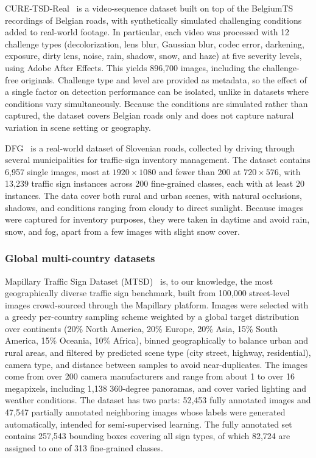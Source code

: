 \documentclass[runningheads]{llncs}
\begin{document}
CURE-TSD-Real~\cite{temel2019traffic} is a video-sequence dataset built on top of the BelgiumTS recordings of Belgian roads, with synthetically simulated challenging conditions added to real-world footage. In particular, each video was processed with 12 challenge types (decolorization, lens blur, Gaussian blur, codec error, darkening, exposure, dirty lens, noise, rain, shadow, snow, and haze) at five severity levels, using Adobe After Effects. This yields 896,700 images, including the challenge-free originals. Challenge type and level are provided as metadata, so the effect of a single factor on detection performance can be isolated, unlike in datasets where conditions vary simultaneously. Because the conditions are simulated rather than captured, the dataset covers Belgian roads only and does not capture natural variation in scene setting or geography.

DFG~\cite{tabernik2019deep} is a real-world dataset of Slovenian roads, collected by driving through several municipalities for traffic-sign inventory management. The dataset contains 6,957 single images, most at $1920\times1080$ and fewer than 200 at $720\times576$, with 13,239 traffic sign instances across 200 fine-grained classes, each with at least 20 instances. The data cover both rural and urban scenes, with natural occlusions, shadows, and conditions ranging from cloudy to direct sunlight. Because images were captured for inventory purposes, they were taken in daytime and avoid rain, snow, and fog, apart from a few images with slight snow cover.

\subsubsection{Global multi-country datasets}
Mapillary Traffic Sign Dataset (MTSD)~\cite{ertler2020mapillary} is, to our knowledge, the most geographically diverse traffic sign benchmark, built from 100,000 street-level images crowd-sourced through the Mapillary platform. Images were selected with a greedy per-country sampling scheme weighted by a global target distribution over continents (20\% North America, 20\% Europe, 20\% Asia, 15\% South America, 15\% Oceania, 10\% Africa), binned geographically to balance urban and rural areas, and filtered by predicted scene type (city street, highway, residential), camera type, and distance between samples to avoid near-duplicates. The images come from over 200 camera manufacturers and range from about 1 to over 16 megapixels, including 1,138 360-degree panoramas, and cover varied lighting and weather conditions. The dataset has two parts: 52,453 fully annotated images and 47,547 partially annotated neighboring images whose labels were generated automatically, intended for semi-supervised learning. The fully annotated set contains 257,543 bounding boxes covering all sign types, of which 82,724 are assigned to one of 313 fine-grained classes.
\end{document}
